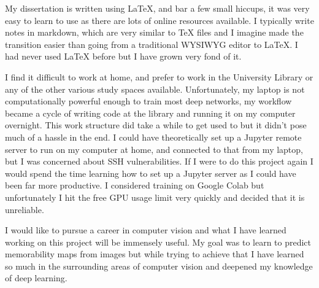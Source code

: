 \documentclass{UoYCSproject}
\begin{document}
My dissertation is written using LaTeX, and bar a few small hiccups, it was very easy to learn to use as there are lots of online resources available. I typically write notes in markdown, which are very similar to TeX files and I imagine made the transition easier than going from a traditional WYSIWYG editor to LaTeX. I had never used LaTeX before but I have grown very fond of it. 

I find it difficult to work at home, and prefer to work in the University Library or any of the other various study spaces available. Unfortunately, my laptop is not computationally powerful enough to train most deep networks, my workflow became a cycle of writing code at the library and running it on my computer overnight. This work structure did take a while to get used to but it didn't pose much of a hassle in the end. I could have theoretically set up a Jupyter remote server to run on my computer at home, and connected to that from my laptop, but I was concerned about SSH vulnerabilities. If I were to do this project again I would spend the time learning how to set up a Jupyter server as I could have been far more productive. I considered training on Google Colab but unfortunately I hit the free GPU usage limit very quickly and decided that it is unreliable. 



I would like to pursue a career in computer vision and what I have learned working on this project will be immensely useful. My goal was to learn to predict memorability maps from images but while trying to achieve that I have learned so much in the surrounding areas of computer vision and deepened my knowledge of deep learning.

\end{document}
